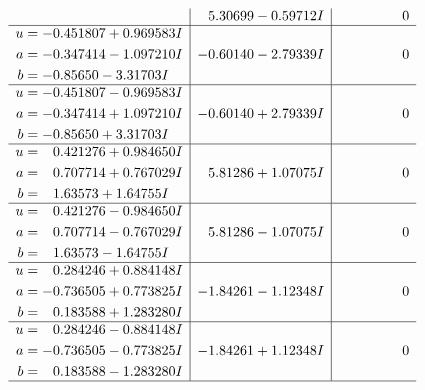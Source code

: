 \documentclass[1p]{elsarticle_modified}
\theoremstyle{definition}
\begin{document}
$$\begin{array}{c|c|c}
 & \phantom{-}5.30699 - 0.59712 I & \phantom{-0.000000 } 0 \\ \hline\begin{aligned}
u &= -0.451807 + 0.969583 I \\
a &= -0.347414 - 1.097210 I \\
b &= -0.85650 - 3.31703 I\end{aligned}
 & -0.60140 - 2.79339 I & \phantom{-0.000000 } 0 \\ \hline\begin{aligned}
u &= -0.451807 - 0.969583 I \\
a &= -0.347414 + 1.097210 I \\
b &= -0.85650 + 3.31703 I\end{aligned}
 & -0.60140 + 2.79339 I & \phantom{-0.000000 } 0 \\ \hline\begin{aligned}
u &= \phantom{-}0.421276 + 0.984650 I \\
a &= \phantom{-}0.707714 + 0.767029 I \\
b &= \phantom{-}1.63573 + 1.64755 I\end{aligned}
 & \phantom{-}5.81286 + 1.07075 I & \phantom{-0.000000 } 0 \\ \hline\begin{aligned}
u &= \phantom{-}0.421276 - 0.984650 I \\
a &= \phantom{-}0.707714 - 0.767029 I \\
b &= \phantom{-}1.63573 - 1.64755 I\end{aligned}
 & \phantom{-}5.81286 - 1.07075 I & \phantom{-0.000000 } 0 \\ \hline\begin{aligned}
u &= \phantom{-}0.284246 + 0.884148 I \\
a &= -0.736505 + 0.773825 I \\
b &= \phantom{-}0.183588 + 1.283280 I\end{aligned}
 & -1.84261 - 1.12348 I & \phantom{-0.000000 } 0 \\ \hline\begin{aligned}
u &= \phantom{-}0.284246 - 0.884148 I \\
a &= -0.736505 - 0.773825 I \\
b &= \phantom{-}0.183588 - 1.283280 I\end{aligned}
 & -1.84261 + 1.12348 I & \phantom{-0.000000 } 0\\
 \hline 
 \end{array}$$\newpage$$\begin{array}{c|c|c}  

\end{array}$$
\end{document}
